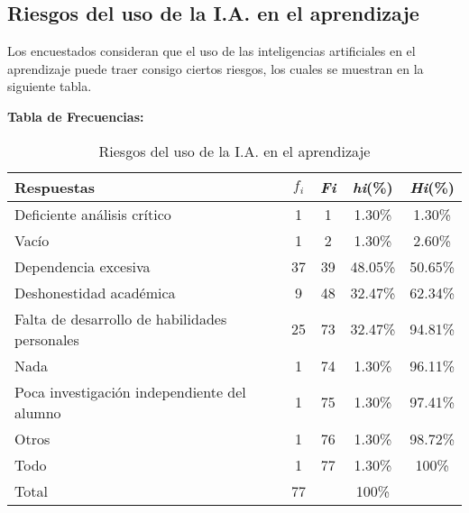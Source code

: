 \subsection{Riesgos del uso de la I.A. en el aprendizaje}

Los encuestados consideran que el uso de las inteligencias artificiales en el aprendizaje puede traer consigo ciertos riesgos, los cuales se muestran en la siguiente tabla.


\textbf{Tabla de Frecuencias:}

\begin{table}[H]
  \centering
  \renewcommand{\arraystretch}{1.5}
  \begin{tabular}{l c c c c}
    \hline
    {Respuestas} & {\(f_i\)} & \textit{Fi} & \textit{hi}(\%) & \textit{Hi}(\%)\\
    \hline
    Deficiente análisis crítico & 1 & 1 & 1.30\% & 1.30\%\\
    Vacío                       & 1 & 2 & 1.30\% & 2.60\%\\
    Dependencia excesiva        & 37 & 39 & 48.05\% & 50.65\%\\
    Deshonestidad académica     & 9  & 48 & 32.47\% & 62.34\%\\
    Falta de desarrollo de habilidades personales & 25 & 73 & 32.47\% & 94.81\%\\
    Nada                        & 1  & 74 & 1.30\% & 96.11\%\\
    Poca investigación independiente del alumno & 1 & 75 & 1.30\% & 97.41\%\\
    Otros                       & 1 & 76 & 1.30\% & 98.72\%\\
    Todo                        & 1 & 77 & 1.30\% & 100\%\\
    \hline
    Total                       & 77 &    & 100\% & \\
    \hline
  \end{tabular}
  \caption{Riesgos del uso de la I.A. en el aprendizaje}
  \label{tabla:riesgosIA}
\end{table}

